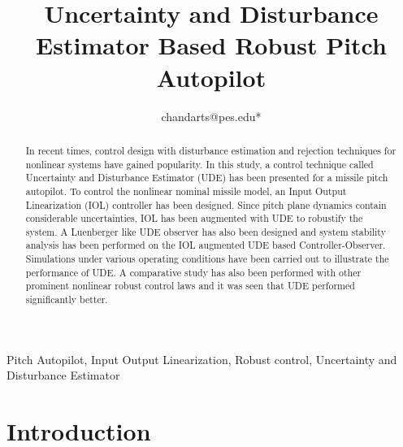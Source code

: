 \documentclass[conference]{IEEEtran}
\begin{document}
\title{Uncertainty and Disturbance Estimator Based Robust Pitch Autopilot}

\author{
 chandarts@pes.edu*
}

\maketitle

\begin{abstract}
	In recent times, control design with disturbance estimation and rejection techniques for nonlinear systems have gained popularity. In this study, a control technique called Uncertainty and Disturbance Estimator (UDE) has been presented for a missile pitch autopilot. To control the nonlinear nominal missile model, an Input Output Linearization (IOL) controller has been designed. Since pitch plane dynamics contain considerable uncertainties, IOL has been augmented with UDE to robustify the system. A Luenberger like UDE observer has also been designed and system stability analysis has been performed on the IOL augmented UDE based Controller-Observer. Simulations under various operating conditions have been carried out to illustrate the performance of UDE. A comparative study has also been performed with other prominent nonlinear robust control laws and it was seen that UDE performed significantly better.
	 
\end{abstract}

\begin{IEEEkeywords}
	Pitch Autopilot, Input Output Linearization, Robust control, Uncertainty and Disturbance Estimator
\end{IEEEkeywords}

\section{Introduction}
	
\end{document}

